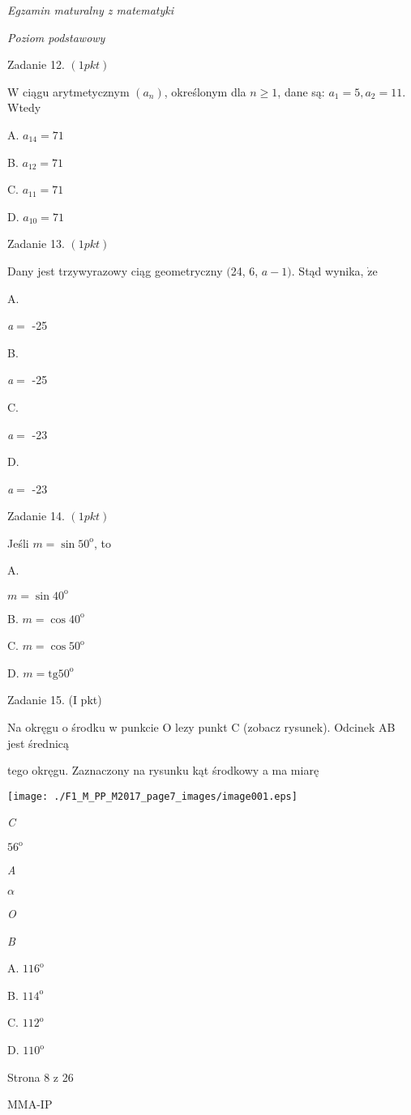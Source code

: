 \documentclass[a4paper,12pt]{article}
\begin{document}
{\it Egzamin maturalny z matematyki}

{\it Poziom podstawowy}

Zadanie 12. $(1pkt)$

$\mathrm{W}$ ciągu arytmetycznym $(a_{n})$, określonym dla $n\geq 1$, dane są: $a_{1}=5, a_{2}=11$. Wtedy

A. $a_{14}=71$

B. $a_{12}=71$

C. $a_{11}=71$

D. $a_{10}=71$

Zadanie 13. $(1pkt)$

Dany jest trzywyrazowy ciąg geometryczny $($24, 6, $a-1)$. Stąd wynika, $\dot{\mathrm{z}}\mathrm{e}$

A.

{\it a}$=$ -25

B.

{\it a}$=$ -25

C.

{\it a}$=$ -23

D.

{\it a}$=$ -23

Zadanie 14. $(1pkt)$

Jeśli $m=\sin 50^{\mathrm{o}}$, to

A.

$m=\sin 40^{\mathrm{o}}$

B. $m=\cos 40^{\mathrm{o}}$

C. $m=\cos 50^{\mathrm{o}}$

D. $m=\mathrm{t}\mathrm{g}50^{\mathrm{o}}$

Zadanie 15. (I pkt)

Na okręgu o środku w punkcie O lezy punkt C (zobacz rysunek). Odcinek AB jest średnicą

tego okręgu. Zaznaczony na rysunku kąt środkowy a ma miarę
\begin{center}
\texttt{[image: ./F1\_M\_PP\_M2017\_page7\_images/image001.eps]}
\end{center}
{\it C}

$56^{\mathrm{o}}$

{\it A}

$\alpha$

{\it O}

{\it B}

A. $116^{\mathrm{o}}$

B. $114^{\mathrm{o}}$

C. $112^{\mathrm{o}}$

D. $110^{\mathrm{o}}$

Strona 8 z 26

MMA-IP
\end{document}
